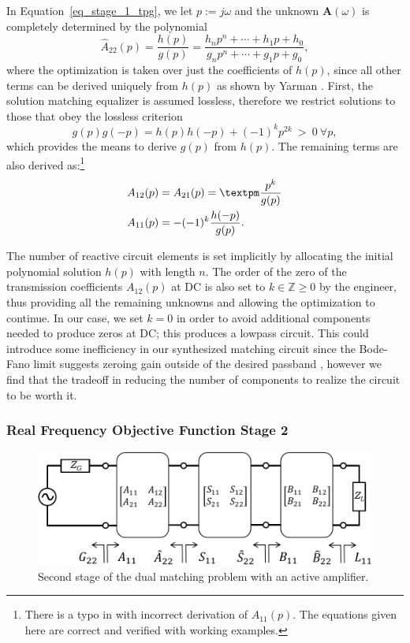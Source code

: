 	In Equation~\ref{eq_stage_1_tpg}, we let $p:=j\omega$ and the unknown $\mathbf{A}(\omega)$ is completely determined by the polynomial
\begin{equation}	
\hat{A}_{22}(p) = \frac{h(p)}{g(p)} = \frac{h_np^n+\dotsb+h_1p+h_0}{g_np^n+\dotsb+g_1p+g_0}, \label{eq_belevich_poly}
\end{equation}
where the optimization is taken over just the coefficients of $h(p)$, since all other terms can be derived uniquely from $h(p)$ as shown by Yarman \cite{yarman1982simplified}.
	First, the solution matching equalizer is assumed lossless, therefore we restrict solutions to those that obey the lossless criterion $$g(p)g(-p)=h(p)h(-p)+(-1)^k p^{2k} ~>~ 0 ~\forall p,$$
which provides the means to derive $g(p)$ from $h(p)$. %
	The remaining terms are also derived as:\footnote{There is a typo in \cite{yarman2010design} with incorrect derivation of $A_{11}(p)$. The equations given here are correct and verified with working examples.}
\begin{align}
	A_{12}(p) &= A_{21}(p) = \textpm \frac{p^k}{g(p)} \\
	A_{11}(p) &= -(-1)^k\frac{h(-p)}{g(p)}.
\end{align}

	The number of reactive circuit elements is set implicitly by allocating the initial polynomial solution $h(p)$ with length $n$.
	The order of the zero of the transmission coefficients $A_{12}(p)$ at DC is also set to $k \in \mathbb{Z} \geqslant 0$ by the engineer, thus providing all the remaining unknowns and allowing the optimization to continue.
	In our case, we set $k=0$ in order to avoid additional components needed to produce zeros at DC; this produces a lowpass circuit.
	This could introduce some inefficiency in our synthesized matching circuit since the Bode-Fano limit suggests zeroing gain outside of the desired passband \cite{bode1945network, fano1950theoretical}, however we find that the tradeoff in reducing the number of components to realize the circuit to be worth it.
	
\subsubsection{Real Frequency Objective Function Stage 2}
\label{sec_srft_stage_2}

\begin{figure}[h]
\centering
  \includegraphics[width=0.8\linewidth]{figs/matching/matching_stage_2}   
    \caption{Second stage of the dual matching problem with an active amplifier.}
\label{fig_matching_stage_2}
\end{figure}

